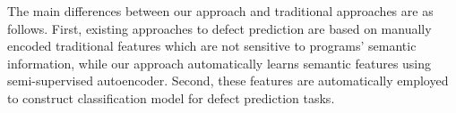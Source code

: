 The main differences between our approach and traditional approaches are as follows. First, existing approaches to defect prediction are based on manually encoded traditional features which are not sensitive to programs' semantic information, while our approach automatically learns semantic features using semi-supervised autoencoder. Second, these features are automatically employed to construct classification model for defect prediction tasks. 

%
